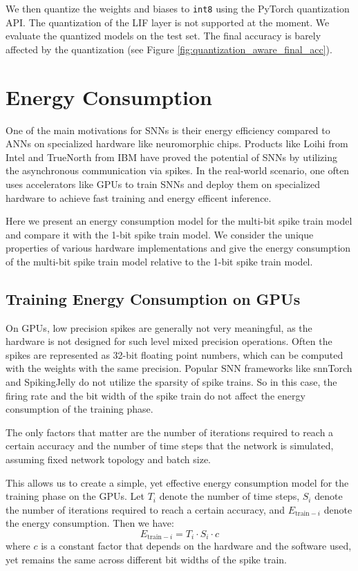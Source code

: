     We then quantize the weights and biases to \verb|int8| using the PyTorch quantization API. The quantization of the LIF layer is not supported at the moment. We evaluate the quantized models on the test set. The final accuracy is barely affected by the quantization (see Figure \ref{fig:quantization_aware_final_acc}). 

\section{Energy Consumption}
\label{sec:energy-consumption}
    One of the main motivations for SNNs is their energy efficiency compared to ANNs on specialized hardware like neuromorphic chips. Products like Loihi from Intel \cite{8259423} and TrueNorth from IBM \cite{7229264} have proved the potential of SNNs by utilizing the asynchronous communication via spikes. In the real-world scenario, one often uses accelerators like GPUs to train SNNs and deploy them on specialized hardware to achieve fast training and energy efficent inference. 

    Here we present an energy consumption model for the multi-bit spike train model and compare it with the 1-bit spike train model. We consider the unique properties of various hardware implementations and give the energy consumption of the multi-bit spike train model relative to the 1-bit spike train model. 

    \subsection{Training Energy Consumption on GPUs}
    \label{subsec:training_energy}
        On GPUs, low precision spikes are generally not very meaningful, as the hardware is not designed for such level mixed precision operations. Often the spikes are represented as 32-bit floating point numbers, which can be computed with the weights with the same precision. Popular SNN frameworks like snnTorch and SpikingJelly do not utilize the sparsity of spike trains. So in this case, the firing rate and the bit width of the spike train do not affect the energy consumption of the training phase. 
    
        The only factors that matter are the number of iterations required to reach a certain accuracy and the number of time steps that the network is simulated, assuming fixed network topology and batch size. 
    
        This allows us to create a simple, yet effective energy consumption model for the training phase on the GPUs. Let $T_i$ denote the number of time steps, $S_i$ denote the number of iterations required to reach a certain accuracy, and $E_{\text{train}-i}$ denote the energy consumption. Then we have:
        \begin{equation}
            E_{\text{train}-i} = T_i \cdot S_i \cdot c
        \end{equation}
        where $c$ is a constant factor that depends on the hardware and the software used, yet remains the same across different bit widths of the spike train. 
    
